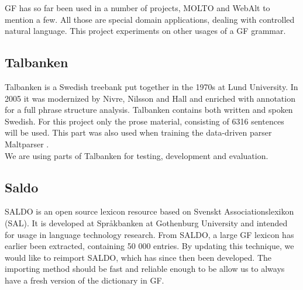 \documentclass[submission]{eptcs} %
\begin{document}
GF has so far been used in a number of projects, MOLTO\cite{molto} and
WebAlt\cite{webalt} to mention a few. 
All those are special domain applications, dealing with controlled natural
language.
This project experiments on other usages of a GF grammar.



\subsection{Talbanken}
Talbanken\cite{talbanken} is
a Swedish treebank put together in the 1970s at Lund University.
In 2005 it was modernized by Nivre, Nilsson and Hall\cite{talbanken05} and
enriched with annotation for a
full phrase structure analysis. 
Talbanken contains both written and spoken Swedish. For this project only
the prose material, consisting of 6316 sentences will be used.
This part was also used when training the data-driven parser Maltparser \cite{malt}. \\
We are using parts of Talbanken for testing, development and evaluation.

\subsection{Saldo}
SALDO\cite{saldo} is an open source lexicon resource
based on Svenskt Associationslexikon (SAL). It is
developed at Språkbanken at Gothenburg University
and intended for usage in language technology
research. 
From SALDO, a large GF lexicon
has earlier been extracted,
containing 50 000 entries.
By updating this technique, we would like
to reimport SALDO, which has since then been developed.
The importing method should be fast and reliable
enough to be allow us to always have a fresh version of the dictionary
in GF.
\end{document}
